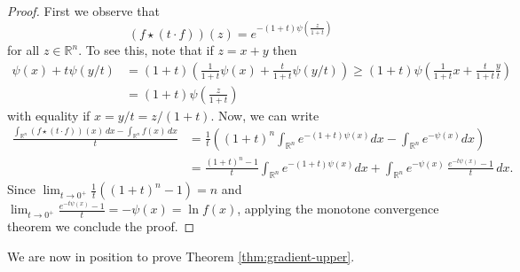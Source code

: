 \documentclass[11pt,leqno]{article}
\theoremstyle{definition}
\theoremstyle{remark}
\numberwithin{equation}{section}
\newcommand{\gr}{\geqslant}
\newcommand{\1}{\textbf{1}}
\begin{document}
\begin{proof}First we observe that
$$(f\star (t\cdot f))(z)=e^{-(1+t)\psi\left(\frac{z}{1+t}\right)}$$
for all $z\in\mathbb{R}^n$. To see this, note that if $z=x+y$ then
\begin{align*}\psi(x)+t\psi(y/t) &=(1+t)\left(\frac{1}{1+t}\psi(x)+\frac{t}{1+t}\psi(y/t)\right)\gr (1+t)\psi\left(\frac{1}{1+t}x+\frac{t}{1+t}\frac{y}{t}\right)\\
&=(1+t)\psi\left(\frac{z}{1+t}\right)
\end{align*}
with equality if $x=y/t=z/(1+t)$. Now, we can write
\begin{align*}
\frac{\int_{\mathbb{R}^n}(f\star (t\cdot f))(x)\,dx-\int_{\mathbb{R}^n}f(x)\,dx}{t} &=
\frac{1}{t}\left((1+t)^n\int_{\mathbb{R}^n}e^{-(1+t)\psi(x)}dx-\int_{\mathbb{R}^n}e^{-\psi(x)}dx\right)\\
&=\frac{(1+t)^n-1}{t}\int_{\mathbb{R}^n}e^{-(1+t)\psi(x)}dx+\int_{\mathbb{R}^n}e^{-\psi(x)}\,\frac{e^{-t\psi(x)}-1}{t}\,dx.
\end{align*}
Since $\lim_{t\to 0^+}\frac{1}{t}((1+t)^n-1)=n$ and $\lim_{t\to 0^+}\frac{e^{-t\psi(x)}-1}{t}=-\psi(x)=\ln f(x)$, applying
the monotone convergence theorem we conclude the proof.
\end{proof}

We are now in position to prove Theorem \ref{thm:gradient-upper}.
\end{document}
